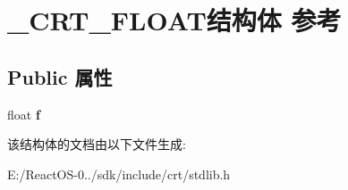 \hypertarget{struct___c_r_t___f_l_o_a_t}{}\section{\+\_\+\+C\+R\+T\+\_\+\+F\+L\+O\+A\+T结构体 参考}
\label{struct___c_r_t___f_l_o_a_t}
\subsection*{Public 属性}
\begin{DoxyCompactItemize}
\item 
\mbox{\label{struct___c_r_t___f_l_o_a_t_a2eeb6058bb56c85f9383b5f1806da29a}} 
float {\bfseries f}
\end{DoxyCompactItemize}


该结构体的文档由以下文件生成\+:\begin{DoxyCompactItemize}
\item 
E\+:/\+React\+O\+S-\/0../sdk/include/crt/stdlib.\+h\end{DoxyCompactItemize}
